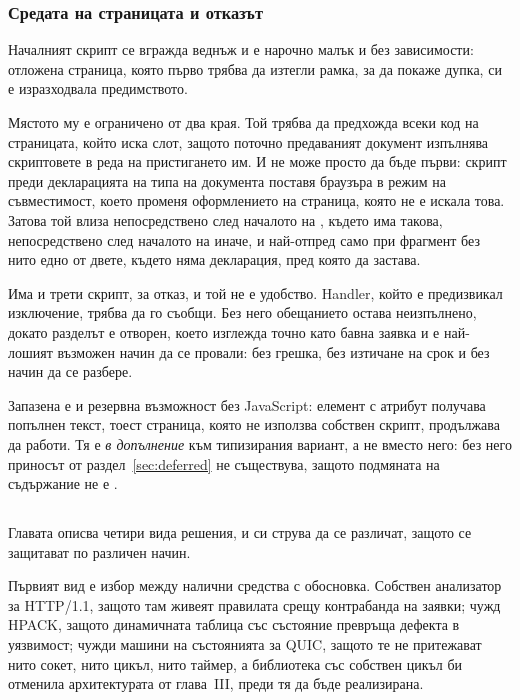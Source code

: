 \subsubsection{Средата на страницата и отказът}

Началният скрипт се вгражда веднъж и е нарочно малък и без зависимости: отложена страница,
която първо трябва да изтегли рамка, за да покаже дупка, си е изразходвала предимството.

Мястото му е ограничено от два края. Той трябва да предхожда всеки код на страницата, който
иска слот, защото поточно предаваният документ изпълнява скриптовете в реда на пристигането
им. И не може просто да бъде първи: скрипт преди декларацията на типа на документа поставя
браузъра в режим на съвместимост, което променя оформлението на страница, която не е искала
това. Затова той влиза непосредствено след началото на , където има такова,
непосредствено след началото на  иначе, и най-отпред само при фрагмент без нито
едно от двете, където няма декларация, пред която да застава.

Има и трети скрипт, за отказ, и той не е удобство. Handler, който е предизвикал изключение,
трябва да го съобщи. Без него обещанието остава неизпълнено, докато разделът е отворен, което
изглежда точно като бавна заявка и е най-лошият възможен начин да се провали: без грешка, без
изтичане на срок и без начин да се разбере.

Запазена е и резервна възможност без JavaScript: елемент с атрибут
 получава попълнен текст, тоест страница, която не използва собствен
скрипт, продължава да работи. Тя е \emph{в допълнение} към типизирания вариант, а не вместо
него: без него приносът от раздел~\ref{sec:deferred} не съществува, защото подмяната на
съдържание не е .

\subsection{}

Главата описва четири вида решения, и си струва да се различат, защото се защитават по
различен начин.

Първият вид е избор между налични средства с обосновка. Собствен анализатор за HTTP/1.1,
защото там живеят правилата срещу контрабанда на заявки; чужд HPACK, защото динамичната
таблица със състояние превръща дефекта в уязвимост; чужди машини на състоянията за QUIC,
защото те не притежават нито сокет, нито цикъл, нито таймер, а библиотека със собствен цикъл
би отменила архитектурата от глава~III, преди тя да бъде реализирана.

